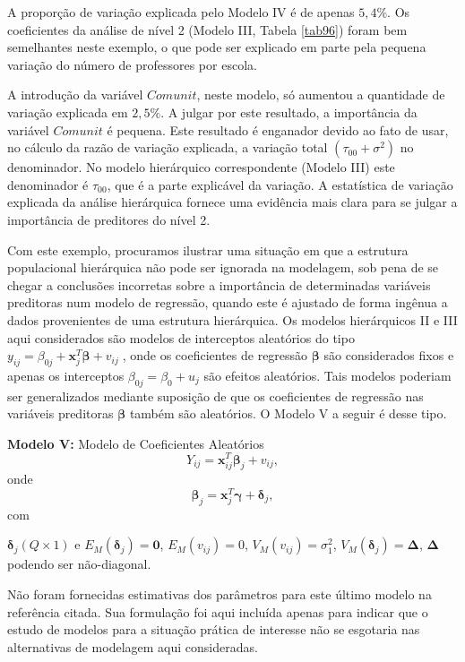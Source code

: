 \documentclass[]{book}
\numberwithin{example}{chapter}
\numberwithin{remark}{chapter}
\numberwithin{definition}{chapter}
\begin{document}
A proporção de variação explicada pelo Modelo IV é de apenas \(5,4\%\).
Os coeficientes da análise de nível 2 (Modelo III, Tabela \ref{tab96})
foram bem semelhantes neste exemplo, o que pode ser explicado em parte
pela pequena variação do número de professores por escola.

A introdução da variável \(Comunit\), neste modelo, só aumentou a
quantidade de variação explicada em \(2,5\%\). A julgar por este
resultado, a importância da variável \(Comunit\) é pequena. Este
resultado é enganador devido ao fato de usar, no cálculo da razão de
variação explicada, a variação total
\(\left( \tau _{00}+\sigma ^{2}\right)\) no denominador. No modelo
hierárquico correspondente (Modelo III) este denominador é
\(\tau_{00}\), que é a parte explicável da variação. A estatística de
variação explicada da análise hierárquica fornece uma evidência mais
clara para se julgar a importância de preditores do nível 2.

Com este exemplo, procuramos ilustrar uma situação em que a estrutura
populacional hierárquica não pode ser ignorada na modelagem, sob pena de
se chegar a conclusões incorretas sobre a importância de determinadas
variáveis preditoras num modelo de regressão, quando este é ajustado de
forma ingênua a dados provenientes de uma estrutura hierárquica. Os
modelos hierárquicos II e III aqui considerados são modelos de
interceptos aleatórios do tipo
\(y_{ij}=\beta _{0j}+\mathbf{x}_{j}^{T}\mathbf{\beta +}v_{ij}\;\), onde
os coeficientes de regressão \(\mathbf{\beta }\) são considerados fixos
e apenas os interceptos \(\beta _{0j}=\beta _{0}+u_{j}\) são efeitos
aleatórios. Tais modelos poderiam ser generalizados mediante suposição
de que os coeficientes de regressão nas variáveis preditoras
\(\mathbf{\beta}\) também são aleatórios. O Modelo V a seguir é desse
tipo.

\textbf{Modelo V:} Modelo de Coeficientes Aleatórios \[
Y_{ij}=\mathbf{x}_{ij}^{T}\mathbf{\beta }_{j}+v_{ij},
\] onde \[
\mathbf{\beta }_{j}=\mathbf{x}_{j}^{T}\mathbf{\gamma }+\mathbf{\delta }_{j},
\] com

\(\mathbf{\delta }_{j}(Q\times 1)\) e
\(E_{M}\left( \mathbf{\delta}_{j}\right) =\mathbf{0}\),
\(E_{M}\left( v_{ij}\right) =0\),
\(V_{M}\left(v_{ij}\right) =\sigma _{1}^{2}\),
\(V_{M}\left( \mathbf{\delta }_{j}\right) =\mathbf{\Delta }\),
\(\mathbf{\Delta}\) podendo ser não-diagonal.

Não foram fornecidas estimativas dos parâmetros para este último modelo
na referência citada. Sua formulação foi aqui incluída apenas para
indicar que o estudo de modelos para a situação prática de interesse não
se esgotaria nas alternativas de modelagem aqui consideradas.
\end{document}
